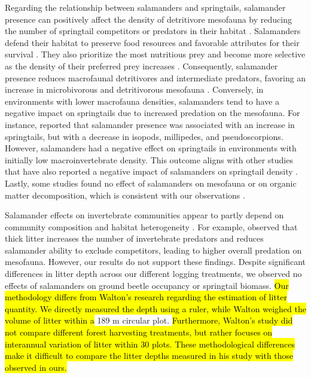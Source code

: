 Regarding the relationship between salamanders and springtails, salamander presence can positively affect the density of detritivore mesofauna by reducing the number of springtail competitors or predators in their habitat \citep{Wyman1998Experimentalassessment,Rooney2000impactsalamander,Walton2005Contrastingeffects,Walton2006Salamandersforestfloor}. 
Salamanders defend their habitat to preserve food resources and favorable attributes for their survival \citep{Gall2003BehavioralInteractions,Hickerson2004Behavioralinteractions,Hickerson2012Interactionsforestfloor}. 
They also prioritize the most nutritious prey and become more selective as the density of their preferred prey increases \citep{Jaeger1981Foragingtactics,Jaeger1982ForagingTactics}. 
Consequently, salamander presence reduces macrofaunal detritivores and intermediate predators, favoring an increase in microbivorous and detritivorous mesofauna \citep{Rooney2000impactsalamander,Walton2005Contrastingeffects,Walton2006Salamandersforestfloor}. 
Conversely, in environments with lower macrofauna densities, salamanders tend to have a negative impact on springtails due to increased predation on the mesofauna. 
For instance, \cite{Walton2006Salamandersforestfloor} reported that salamander presence was associated with an increase in springtails, but with a decrease in isopods, millipedes, and pseudoscorpions. 
However, salamanders had a negative effect on springtails in environments with initially low macroinvertebrate density. 
This outcome aligns with other studies that have also reported a negative impact of salamanders on springtail density \citep{Hickerson2017Easternredbacked}. 
Lastly, some studies found no effect of salamanders on mesofauna or on organic matter decomposition, which is consistent with our observations \citep{Hocking2013Effectsexperimental,Hocking2014Effectsredbacked}.

Salamander effects on invertebrate communities appear to partly depend on community composition and habitat heterogeneity \citep{MichaelWalton2005Salamandersforestfloor,Walton2006Salamandersforestfloor,Walton2013Topdownregulation,Best2014trophicrole}. 
For example, \cite{Walton2013Topdownregulation} observed that thick litter increases the number of invertebrate predators and reduces salamander ability to exclude competitors, leading to higher overall predation on mesofauna. 
However, our results do not support these findings. 
Despite significant differences in litter depth across our different logging treatments, we observed no effects of salamanders on ground beetle occupancy or springtail biomass. 
\hl{Our methodology differs from Walton's research regarding the estimation of litter quantity. 
We directly measured the depth using a ruler, while Walton weighed the volume of litter within a} 189 m circular plot. 
\hl{Furthermore, Walton's study did not compare different forest harvesting treatments, but rather focuses on interannual variation of litter within 30 plots. 
These methodological differences make it difficult to compare the litter depths measured in his study with those observed in ours.}


